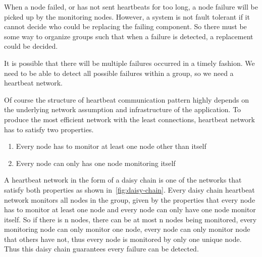
When a node failed, or has not sent heartbeats for too long, a node failure
will be picked up by the monitoring nodes. However, a system is not fault
tolerant if it cannot decide who could be replacing the failing component. So
there must be some way to organize groups such that when a failure is detected,
a replacement could be decided.


It is possible that there will be multiple failures occurred in a timely
fashion. We need to be able to detect all possible failures within a group, so we need a heartbeat network.


Of course the structure of heartbeat communication pattern highly depends on the underlying network assumption and infrastructure of the application. To produce the most efficient network with the least connections, heartbeat network has to satisfy two properties.

\begin{enumerate}
\item Every node has to monitor at least one node other than itself
\item Every node can only has one node monitoring itself
\end{enumerate}


A heartbeat network in the form of a daisy chain is one of the networks that
satisfy both properties as shown in~\ref{fig:daisy-chain}. Every daisy chain heartbeat network monitors all nodes
in the group, given by the properties that every node has to monitor at least
one node and every node can only have one node monitor itself. So if there is
n nodes, there can be at most n nodes being monitored, every monitoring node
can only monitor one node, every node can only monitor node that others have
not, thus every node is monitored by only one unique node. Thus this daisy
chain guarantees every failure can be detected.

